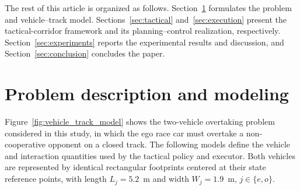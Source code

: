 \documentclass[journal,twoside,web]{ieeecolor}
\begin{document}
The rest of this article is organized as follows.
Section~\ref{sec:model}
formulates the problem and vehicle--track model. Sections~\ref{sec:tactical}
and~\ref{sec:execution} present the tactical-corridor framework and its
planning--control realization, respectively. Section~\ref{sec:experiments}
reports the experimental results and discussion, and
Section~\ref{sec:conclusion} concludes the paper.

\begingroup
\setlength{\abovedisplayskip}{6pt plus 1pt minus 1pt}
\setlength{\belowdisplayskip}{6pt plus 1pt minus 1pt}
\setlength{\abovedisplayshortskip}{4pt plus 1pt minus 1pt}
\setlength{\belowdisplayshortskip}{4pt plus 1pt minus 1pt}
\setlength{\jot}{2pt}
\section{Problem description and modeling}
\label{sec:model}
Figure~\ref{fig:vehicle_track_model} shows the two-vehicle overtaking problem
considered in this study, in which the ego race car must overtake a
non-cooperative opponent on a closed track. The following
models define the vehicle and interaction quantities used by the tactical
policy and executor. Both vehicles are represented by identical rectangular
footprints centered at their state reference points, with length $L_j=5.2$~m
and width $W_j=1.9$~m,
$j\in\{e,o\}$.
\end{document}
